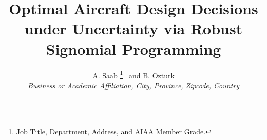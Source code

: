  \title{Optimal Aircraft Design Decisions under Uncertainty via Robust Signomial Programming}

 \author{
  A. Saab%
    \thanks{Job Title, Department, Address, and AIAA Member Grade.}
  \ and B. Ozturk\\
  {\normalsize\itshape
   Business or Academic Affiliation, City, Province, Zipcode, Country}\\
 }


 \newcommand{\eqnref}[1]{(\ref{#1})}
 \newcommand{\class}[1]{\texttt{#1}}
 \newcommand{\package}[1]{\texttt{#1}}
 \newcommand{\file}[1]{\texttt{#1}}
 \newcommand{\BibTeX}{\textsc{Bib}\TeX}

\renewcommand{\vec}{\mathbf}
\newcommand{\mat}{\mathbf}

\usepackage[utf8]{inputenc}
\usepackage{algorithm}
\usepackage{bbm}
\usepackage{amsmath}
\usepackage{amsthm}
\usepackage{amssymb}
\usepackage{multicol}
\usepackage{tabularx}
\usepackage[toc,page]{appendix}
\usepackage{verbatim}
\usepackage{tikz}
\usepackage{tkz-kiviat}
\usetikzlibrary{arrows}
 
 \newtheorem{theorem}{Theorem}[section]
 \newtheorem{corollary}{Corollary}[theorem]
 \newtheorem{lemma}[theorem]{Lemma}
 \newtheorem{proposition}[theorem]{Proposition}